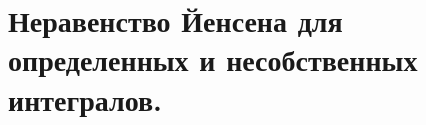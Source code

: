 \documentclass[../main.tex]{subfiles}
\begin{document}
\newpage
\section{Неравенство Йенсена для определенных и несобственных интегралов.}
\end{document}
